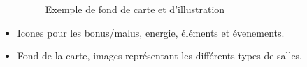 \begin{itemize}
\begin{figure}[h]
\begin{center}
%
\qquad
{}%
\caption{\label{slaythespiregame}Exemple de fond de carte et d'illustration}
\end{center}
\end{figure}

    \item Icones pour les bonus/malus, energie, éléments et évenements.
    \item Fond de la carte, images représentant les différents types de salles.
\end{itemize}


\clearpage
